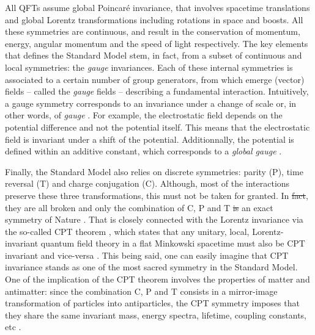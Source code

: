 \documentclass[ALICE,manyauthors]{cernphprep}
\providecommand{\DIFaddtex}[1]{{\protect\color{blue}\uwave{#1}}} %
\providecommand{\DIFdeltex}[1]{{\protect\color{red}\sout{#1}}}                      %
\providecommand{\DIFaddbegin}{} %
\providecommand{\DIFaddend}{} %
\providecommand{\DIFdelbegin}{} %
\providecommand{\DIFdelend}{} %
\providecommand{\DIFadd}[1]{\texorpdfstring{\DIFaddtex{#1}}{#1}} %
\providecommand{\DIFdel}[1]{\texorpdfstring{\DIFdeltex{#1}}{}} %
\newcommand{\DIFscaledelfig}{0.5}
\newlength{\DIFdelgraphicswidth} %
\newlength{\DIFdelgraphicsheight} %
\newcommand{\DIFaddincludegraphics}[2][]{{\color{blue}\fbox{\DIFOincludegraphics[#1]{#2}}}} %
\newcommand{\DIFdelincludegraphics}[2][]{%
\sbox{\DIFdelgraphicsbox}{\DIFOincludegraphics[#1]{#2}}%
\settoboxwidth{\DIFdelgraphicswidth}{\DIFdelgraphicsbox} %
\settoboxtotalheight{\DIFdelgraphicsheight}{\DIFdelgraphicsbox} %
\scalebox{\DIFscaledelfig}{%
\parbox[b]{\DIFdelgraphicswidth}{\usebox{\DIFdelgraphicsbox}\\[-\baselineskip] \rule{\DIFdelgraphicswidth}{0em}}\llap{\resizebox{\DIFdelgraphicswidth}{\DIFdelgraphicsheight}{%
\setlength{\unitlength}{\DIFdelgraphicswidth}%
\begin{picture}(1,1)%
\thicklines\linethickness{2pt} %
{\color[rgb]{1,0,0}\put(0,0){\framebox(1,1){}}}%
{\color[rgb]{1,0,0}\put(0,0){\line( 1,1){1}}}%
{\color[rgb]{1,0,0}\put(0,1){\line(1,-1){1}}}%
\end{picture}%
}\hspace*{3pt}}} %
} %
\DeclareRobustCommand{\DIFaddbegin}{\DIFOaddbegin \let\includegraphics\DIFaddincludegraphics} %
\DeclareRobustCommand{\DIFaddend}{\DIFOaddend \let\includegraphics\DIFOincludegraphics} %
\DeclareRobustCommand{\DIFdelbegin}{\DIFOdelbegin \let\includegraphics\DIFdelincludegraphics} %
\DeclareRobustCommand{\DIFdelend}{\DIFOaddend \let\includegraphics\DIFOincludegraphics} %
\begin{document}
All QFTs assume global Poincaré invariance, that involves spacetime translations and global Lorentz transformations including rotations in space and boosts. All these symmetries are continuous, and result in the conservation of momentum, energy, angular momentum and the speed of light respectively. The key elements that defines the Standard Model stem, in fact, from a subset of continuous and local symmetries: the \textit{gauge} invariances. Each of these internal symmetries is associated to a certain number of group generators, from which emerge (vector) fields -- called the \textit{gauge} fields --
describing a fundamental interaction. Intuitively, a gauge symmetry corresponds to an invariance under a change of scale or, in other words, of \textit{gauge} \cite{DefinitionGAUGE2023}. For example, the electrostatic field depends on the potential difference and not the potential itself. This means that the electrostatic field is invariant under a shift of the potential. Additionnally, the potential is defined within an additive constant, which corresponds to a \textit{global gauge} \cite{braibantParticlesFundamentalInteractions2012}.

Finally, the Standard Model also relies on discrete symmetries: parity (P), time reversal (T) and charge conjugation (C). Although, most of the interactions preserve these three transformations, this must not be taken for granted. In \DIFdelbegin \DIFdel{fact}\DIFdelend \DIFaddbegin \DIFadd{the current state of the Universe}\DIFaddend , they are all broken and only the combination of C, P and T \DIFdelbegin \DIFdel{is }\DIFdelend \DIFaddbegin \DIFadd{still holds as }\DIFaddend an exact symmetry of Nature \cite{sozziTestsDiscreteSymmetries2019}. That is closely connected with the Lorentz invariance via the so-called CPT theorem \cite{lehnertCPTSymmetryIts2016}, which states that any unitary, local, Lorentz-invariant quantum field theory in a flat Minkowski spacetime must also be CPT invariant and vice-versa \cite{lehnertCPTSymmetryIts2016}\cite{sachsPhysicsTimeReversal1987}. This being said, one can easily imagine that CPT invariance stands as one of the most sacred symmetry in the Standard Model. One of the implication of the CPT theorem involves the properties of matter and antimatter: since the combination C, P and T consists in a mirror-image transformation of particles into antiparticles, the CPT symmetry imposes that they share the same invariant mass, energy spectra, lifetime, coupling constants, etc  \cite{lehnertCPTSymmetryIts2016}\cite{schotterMultidifferentialInvestigationStrangeness2023}.
\end{document}
